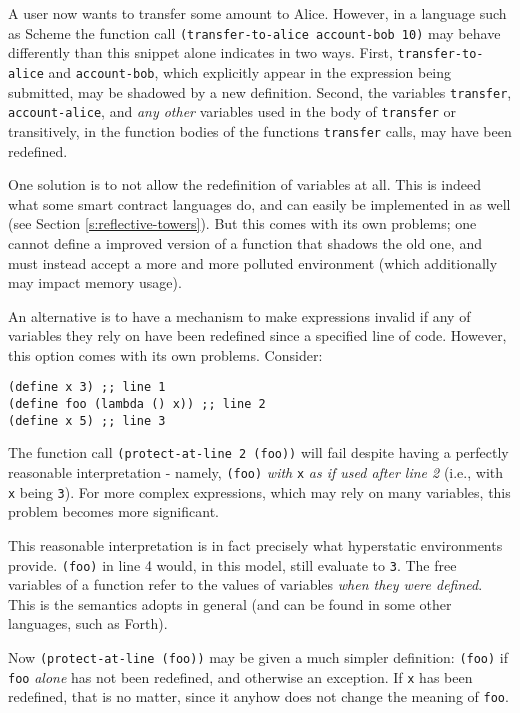 A user now wants to transfer some amount to Alice. However, in a language such
as Scheme the function call \texttt{(transfer-to-alice account-bob 10)} may
behave differently than this snippet alone indicates in two ways. First,
\texttt{transfer-to-alice} and \texttt{account-bob}, which explicitly appear in
the expression being submitted, may be shadowed by a new definition. Second,
the variables \texttt{transfer}, \texttt{account-alice}, and \emph{any other}
variables used in the body of \texttt{transfer} or transitively, in the
function bodies of the functions \texttt{transfer} calls, may have been
redefined.

One solution is to not allow the redefinition of variables at all. This is
indeed what some smart contract languages do, and can easily be implemented in \rad
as well (see Section \ref{s:reflective-towers}). But this comes with its own
problems; one cannot define a improved version of a function that shadows the
old one, and must instead accept a more and more polluted environment (which
additionally may impact memory usage).

An alternative is to have a mechanism to make expressions invalid if any of
variables they rely on have been redefined since a specified line of code.
However, this option comes with its own problems. Consider:

\begin{verbatim}
(define x 3) ;; line 1
(define foo (lambda () x)) ;; line 2
(define x 5) ;; line 3
\end{verbatim}

The function call \texttt{(protect-at-line 2 (foo))} will fail despite having a
perfectly reasonable interpretation - namely, \texttt{(foo)} \emph{with}
\texttt{x} \emph{as if used after line 2} (i.e., with \texttt{x} being
\texttt{3}). For more complex expressions, which may rely on many variables,
this problem becomes more significant.

This reasonable interpretation is in fact precisely what hyperstatic
environments provide. \texttt{(foo)} in line 4 would, in this model, still
evaluate to \texttt{3}. The free variables of a function refer to the values of
variables \emph{when they were defined}. This is the semantics \rad adopts in
general (and can be found in some other languages, such as Forth).

Now \texttt{(protect-at-line (foo))} may be given a much simpler definition:
\texttt{(foo)} if \texttt{foo} \emph{alone} has not been redefined, and otherwise
an exception. If \texttt{x} has been redefined, that is no matter, since it
anyhow does not change the meaning of \texttt{foo}.

